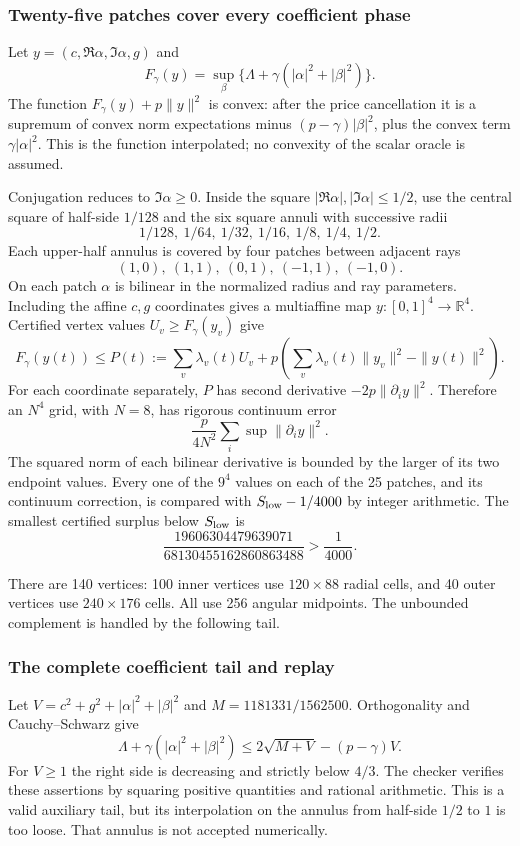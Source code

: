 \subsubsection{Twenty-five patches cover every coefficient phase}
Let $y=(c,\Re\alpha,\Im\alpha,g)$ and
\[
 F_\gamma(y)=\sup_\beta\{\Lambda+\gamma(|\alpha|^2+|\beta|^2)\}.
\]
The function $F_\gamma(y)+p\|y\|^2$ is convex: after the price cancellation it is a supremum of convex norm expectations minus $(p-\gamma)|\beta|^2$, plus the convex term $\gamma|\alpha|^2$. This is the function interpolated; no convexity of the scalar oracle is assumed.

Conjugation reduces to $\Im\alpha\ge0$. Inside the square $|\Re\alpha|,|\Im\alpha|\le1/2$, use the central square of half-side $1/128$ and the six square annuli with successive radii
\[
 1/128,\ 1/64,\ 1/32,\ 1/16,\ 1/8,\ 1/4,\ 1/2.
\]
Each upper-half annulus is covered by four patches between adjacent rays
\[
 (1,0),\ (1,1),\ (0,1),\ (-1,1),\ (-1,0).
\]
On each patch $\alpha$ is bilinear in the normalized radius and ray parameters. Including the affine $c,g$ coordinates gives a multiaffine map $y:[0,1]^4\to\mathbb R^4$. Certified vertex values $U_v\ge F_\gamma(y_v)$ give
\[
 F_\gamma(y(t))\le
 P(t):=\sum_v\lambda_v(t)U_v
       +p\left(\sum_v\lambda_v(t)\|y_v\|^2-\|y(t)\|^2\right).
\]
For each coordinate separately, $P$ has second derivative
$-2p\|\partial_i y\|^2$. Therefore an $N^4$ grid, with $N=8$, has rigorous continuum error
\[
 \frac p{4N^2}\sum_i\sup\|\partial_i y\|^2.
\]
The squared norm of each bilinear derivative is bounded by the larger of its two endpoint values. Every one of the $9^4$ values on each of the 25 patches, and its continuum correction, is compared with $S_{\rm low}-1/4000$ by integer arithmetic. The smallest certified surplus below $S_{\rm low}$ is
\[
 \frac{19606304479639071}{68130455162860863488}>\frac1{4000}.
\]

There are 140 vertices: 100 inner vertices use $120\times88$ radial cells, and 40 outer vertices use $240\times176$ cells. All use 256 angular midpoints. The unbounded complement is handled by the following tail.

\subsubsection{The complete coefficient tail and replay}
Let $V=c^2+g^2+|\alpha|^2+|\beta|^2$ and $M=1181331/1562500$. Orthogonality and Cauchy--Schwarz give
\[
 \Lambda+\gamma(|\alpha|^2+|\beta|^2)
 \le2\sqrt{M+V}-(p-\gamma)V.
\]
For $V\ge1$ the right side is decreasing and strictly below $4/3$. The checker verifies these assertions by squaring positive quantities and rational arithmetic. This is a valid auxiliary tail, but its interpolation on the annulus from half-side $1/2$ to $1$ is too loose. That annulus is not accepted numerically.


